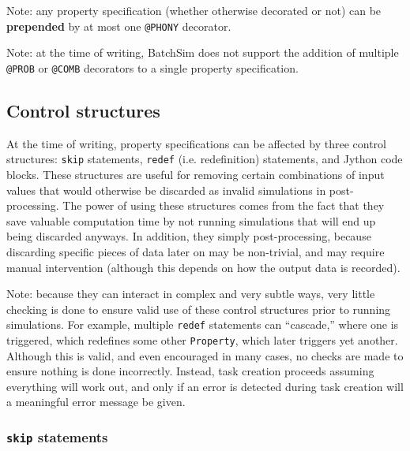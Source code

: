 \documentclass{article}
\begin{document}
\begin{sideblock}
Note: any property specification (whether otherwise decorated or not) can be \textbf{prepended} by at most one {\tt @PHONY} decorator.
\end{sideblock}

\begin{sideblock}
Note: at the time of writing, BatchSim does not support the addition of multiple {\tt @PROB} or {\tt @COMB} decorators to a single property specification.
\end{sideblock}

\subsection{Control structures}

At the time of writing, property specifications can be affected by three control structures: {\tt skip} statements, {\tt redef} (i.e. redefinition) statements, and Jython code blocks. These structures are useful for removing certain combinations of input values that would otherwise be discarded as invalid simulations in post-processing. The power of using these structures comes from the fact that they save valuable computation time by not running simulations that will end up being discarded anyways. In addition, they simply post-processing, because discarding specific pieces of data later on may be non-trivial, and may require manual intervention (although this depends on how the output data is recorded).

\begin{sideblock}
Note: because they can interact in complex and very subtle ways, very little checking is done to ensure valid use of these control structures prior to running simulations. For example, multiple {\tt redef} statements can ``cascade,'' where one is triggered, which redefines some other {\tt Property}, which later triggers yet another. Although this is valid, and even encouraged in many cases, no checks are made to ensure nothing is done incorrectly. Instead, task creation proceeds assuming everything will work out, and only if an error is detected during task creation will a meaningful error message be given.
\end{sideblock}

\subsubsection{{\tt skip} statements}
\end{document}
